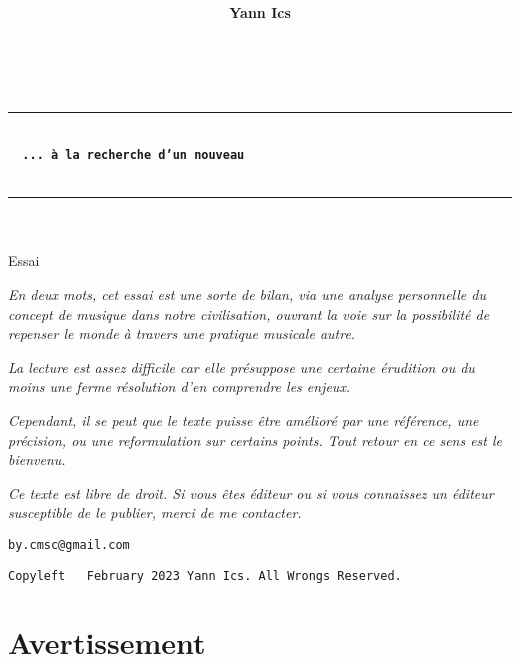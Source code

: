 \documentclass{article}
\title{
}
\author{\textsf{\textbf{Yann Ics}}}
\date{}
\begin{document}
\makeatletter
  \begin{titlepage}
  \centering
  {\Large \@author} \\
  \rule{\linewidth}{.5pt}
  \vspace{4cm}
  {\LARGE \textbf{\@title}} \\
   \vspace{6 mm}
   {\color{brown} {\Large \textbf{\texttt{\, ... à la recherche d'un nouveau}}}}\\
   \vspace{2mm}
   {}\\
  \vfill
  \rule{\linewidth}{.5pt}
     {\Large \textsf{\textsl{}}}\\ 
     {\Large \textsf{\textsl{}}}\\ 	
     {\Large \textsf{Essai}}\\
\end{titlepage}
\makeatother

\pagecolor{white}

{\footnotesize
\vspace*{2cm}
 \textsl{En deux mots, cet essai est une sorte de bilan, via une analyse personnelle du concept de musique dans notre civilisation, ouvrant la voie sur la possibilité de repenser le monde à travers une pratique musicale autre.}
\bigskip

\textsl{La lecture est assez difficile car elle présuppose une certaine érudition ou du moins une ferme résolution d’en comprendre les enjeux. }
\bigskip

\textsl{Cependant, il se peut que le texte puisse être amélioré par une référence, une précision, ou une reformulation sur certains points. Tout retour en ce sens est le bienvenu.}
\bigskip

\textsl{Ce texte est libre de droit. Si vous êtes éditeur ou si vous connaissez un éditeur susceptible de le publier, merci de me contacter.}
\bigskip

\texttt{by.cmsc@gmail.com}}

\vspace*{\fill}
\begin{center} 
 \texttt{Copyleft \textcopyleft \, February 2023 Yann Ics. All Wrongs Reserved.}
 \end{center} 

\newpage

\section*{Avertissement}
\end{document}
